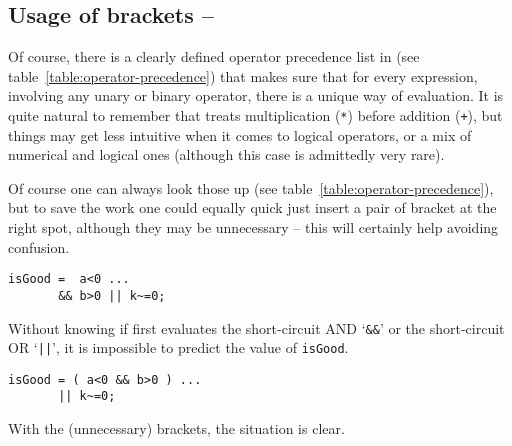 \subsection{Usage of brackets -- \cleansymbol\cleansymbol}
Of course, there is a clearly defined operator precedence list in \matlab{}
(see table~\ref{table:operator-precedence}) that makes sure that for every
\matlab{} expression, involving any unary or binary operator, there is a
unique way of evaluation. It is quite natural to remember that \matlab{}
treats multiplication (\lstinline!*!) before addition (\lstinline!+!), but
things may get less intuitive when it comes to logical operators, or a mix of
numerical and logical ones (although this case is admittedly very rare).

Of course one can always look those up (see
table~\ref{table:operator-precedence}), but to save the work one could equally
quick just insert a pair of bracket at the right spot, although they may be
unnecessary -- this will certainly help avoiding confusion.

\hfill
\begin{minipage}[t]{.45\textwidth}
\begin{lstlisting}[framerule=2pt,rulecolor=\color{badred}]
isGood =  a<0 ...
       && b>0 || k~=0;
\end{lstlisting}
Without knowing if \matlab{} first evaluates the short-circuit AND `\lstinline!&&!' or the short-circuit OR `\lstinline!||!', it is impossible to predict the value of \lstinline!isGood!.
\end{minipage}
\hfill
\begin{minipage}[t]{.45\textwidth}
\begin{lstlisting}[framerule=2pt,rulecolor=\color{goodgreen}]
isGood = ( a<0 && b>0 ) ...
       || k~=0;
\end{lstlisting}
With the (unnecessary) brackets, the situation is clear.
\end{minipage}
\hfill


